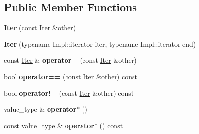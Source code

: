 \subsection*{Public Member Functions}
\begin{DoxyCompactItemize}
\item 
\mbox{\label{classtheoria_1_1util_1_1densemap_1_1Iter_a750c06e8ecf8f5200e0bb8685d385e13}} 
{\bfseries Iter} (const \hyperlink{classtheoria_1_1util_1_1densemap_1_1Iter}{Iter} \&other)
\item 
\mbox{\label{classtheoria_1_1util_1_1densemap_1_1Iter_a796e7241e62ebbfbb3e87db3495e0672}} 
{\bfseries Iter} (typename Impl\+::iterator iter, typename Impl\+::iterator end)
\item 
\mbox{\label{classtheoria_1_1util_1_1densemap_1_1Iter_a94ae1002beb5e2749b842b01f1e40a97}} 
const \hyperlink{classtheoria_1_1util_1_1densemap_1_1Iter}{Iter} \& {\bfseries operator=} (const \hyperlink{classtheoria_1_1util_1_1densemap_1_1Iter}{Iter} \&other)
\item 
\mbox{\label{classtheoria_1_1util_1_1densemap_1_1Iter_a70b1de08a54e34afd57cce65d093eecb}} 
bool {\bfseries operator==} (const \hyperlink{classtheoria_1_1util_1_1densemap_1_1Iter}{Iter} \&other) const
\item 
\mbox{\label{classtheoria_1_1util_1_1densemap_1_1Iter_a3b85c5cb2f068ade9fcf8c8547aacea3}} 
bool {\bfseries operator!=} (const \hyperlink{classtheoria_1_1util_1_1densemap_1_1Iter}{Iter} \&other) const
\item 
\mbox{\label{classtheoria_1_1util_1_1densemap_1_1Iter_ae290045c043b2c9ea6ff17a91217cb04}} 
value\+\_\+type \& {\bfseries operator$\ast$} ()
\item 
\mbox{\label{classtheoria_1_1util_1_1densemap_1_1Iter_ae2865858e0d4e2e8b946b3c3eabe2767}} 
const value\+\_\+type \& {\bfseries operator$\ast$} () const
\item 
\mbox{\label{classtheoria_1_1util_1_1densemap_1_1Iter_af31574e922ff523a77166683a1f12249}} 

\end{DoxyCompactItemize}
